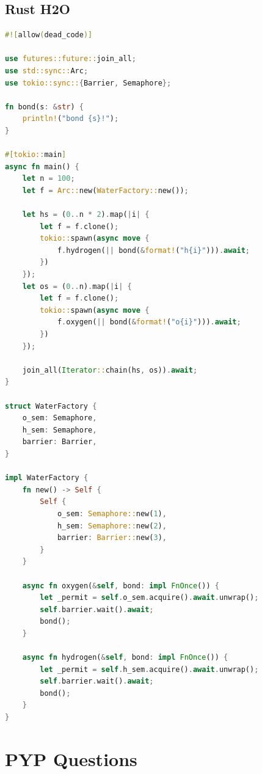 \documentclass{article}
\begin{document}
\subsection{Rust H2O}
\begin{lstlisting}[language=Rust]
#![allow(dead_code)]

use futures::future::join_all;
use std::sync::Arc;
use tokio::sync::{Barrier, Semaphore};

fn bond(s: &str) {
    println!("bond {s}!");
}

#[tokio::main]
async fn main() {
    let n = 100;
    let f = Arc::new(WaterFactory::new());

    let hs = (0..n * 2).map(|i| {
        let f = f.clone();
        tokio::spawn(async move {
            f.hydrogen(|| bond(&format!("h{i}"))).await;
        })
    });
    let os = (0..n).map(|i| {
        let f = f.clone();
        tokio::spawn(async move {
            f.oxygen(|| bond(&format!("o{i}"))).await;
        })
    });

    join_all(Iterator::chain(hs, os)).await;
}

struct WaterFactory {
    o_sem: Semaphore,
    h_sem: Semaphore,
    barrier: Barrier,
}

impl WaterFactory {
    fn new() -> Self {
        Self {
            o_sem: Semaphore::new(1),
            h_sem: Semaphore::new(2),
            barrier: Barrier::new(3),
        }
    }

    async fn oxygen(&self, bond: impl FnOnce()) {
        let _permit = self.o_sem.acquire().await.unwrap();
        self.barrier.wait().await;
        bond();
    }

    async fn hydrogen(&self, bond: impl FnOnce()) {
        let _permit = self.h_sem.acquire().await.unwrap();
        self.barrier.wait().await;
        bond();
    }
}
\end{lstlisting}

\section{PYP Questions}
\end{document}
